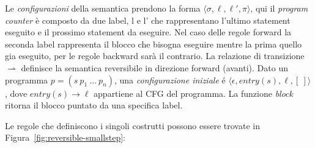 \documentclass{article}
\theoremstyle{plain}
\theoremstyle{definition}
\theoremstyle{plain}
\def \config#1{\langle #1 \rangle}
\newcommand{\s}{\pi}
\newcommand{\entry}{\mathit{entry}}
\newcommand{\nul}{[\:]}
\newcommand{\emptystate}{\epsilon}
\newcommand{\rh}{\rightharpoonup}
\newcommand{\edge}{\longrightarrow}
\begin{document}
Le \emph{configurazioni} della semantica prendono la forma $\config{\sigma,\ell,\ell',\s}$, qui il \emph{program counter} è composto da due label, l e l' che rappresentano l'ultimo statement eseguito e il prossimo statement da eseguire. Nel caso delle regole forward la seconda label rappresenta il blocco che bisogna eseguire mentre la prima quello gia eseguito, per le regole backward sarà il contrario. La relazione di transizione $\rh$ definisce la semantica reversibile in direzione forward (avanti). Dato un programma $p = (s~p_1~\ldots~p_n)$, una \emph{configurazione iniziale} é $\config{\emptystate,\entry(s),\ell,\nul}$, dove $\entry(s) \edge \ell$ appartiene al CFG del programma. La funzione \emph{block} ritorna il blocco puntato da una specifica label.
\bigskip

\noindent Le regole che definiscono i singoli costrutti possono essere trovate in Figura~\ref{fig:reversible-smallstep}:
\end{document}
